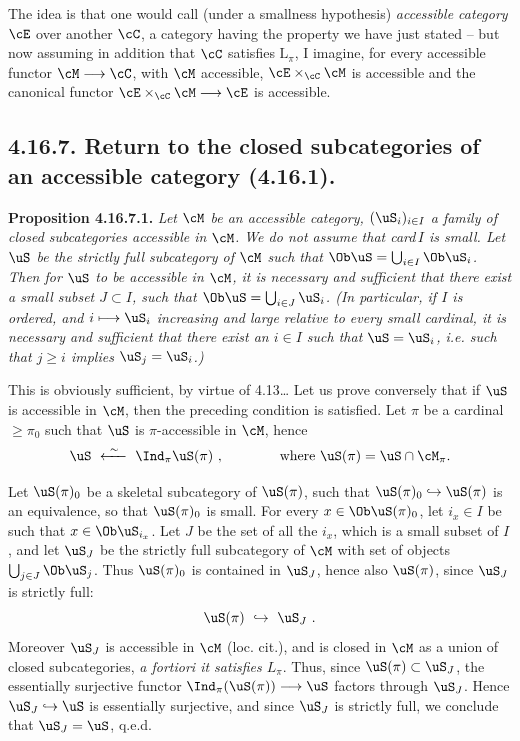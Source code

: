 The idea is that one would call (under a smallness hypothesis) \textit{accessible category $\cE$} over another $\cC$, a category having the property we have just stated -- but now assuming in addition that $\cC$ satisfies $\mathrm{L}_\pi$, I imagine, for every accessible functor $\cM \longrightarrow \cC$, with $\cM$ accessible, $\cE \times_{\cC} \cM$ is accessible and the canonical functor $\cE \times_{\cC} \cM \longrightarrow \cE$ is accessible.

\subsection*{4.16.7. Return to the closed subcategories of an accessible category (4.16.1).}

\textbf{Proposition 4.16.7.1.} \textit{Let $\cM$ be an accessible category, $(\uS_i)_{i\in I}$ a family of closed subcategories accessible in $\cM$. We do not assume that \textup{card}\,$I$ is small. Let $\uS$ be the strictly full subcategory of $\cM$ such that $\Ob \uS = \bigcup_{i\in I} \Ob \uS_i$. Then for $\uS$ %
to be accessible in $\cM$, it is necessary and sufficient that there exist a \textup{small} subset $J \subset I$, such that $\Ob \uS = \bigcup_{i\in J} \uS_i$. (In particular, if $I$ is ordered, and $i \longmapsto \uS_i$ increasing and large relative to every small cardinal, it is necessary and sufficient that there exist an $i \in I$ such that $\uS = \uS_i$, i.e. such that $j \geqslant i$ implies $\uS_j = \uS_i$.)}

This is obviously sufficient, by virtue of 4.13\dots{} Let us prove conversely that if $\uS$ is accessible in $\cM$, then the preceding condition is satisfied. Let $\pi$ be a cardinal $\geqslant \pi_0$ such that $\uS$ is $\pi$-accessible in $\cM$, hence
\[
\uS \ \xleftarrow{\ \sim\ }\ \Ind_\pi \uS(\pi) \ , \qquad\qquad \text{where } \uS(\pi) = \uS \cap \cM_\pi.
\]

Let $\uS(\pi)_0$ be a skeletal subcategory of $\uS(\pi)$, such that $\uS(\pi)_0 \hookrightarrow \uS(\pi)$ is an equivalence, so that $\uS(\pi)_0$ is small. For every $x \in \Ob \uS(\pi)_0$, let $i_x \in I$ be such that $x \in \Ob \uS_{i_x}$. Let $J$ be the set of all the $i_x$, which is a small subset of $I$, and let $\uS_J$ be the strictly full subcategory of $\cM$ with set of objects $\bigcup_{j\in J} \Ob \uS_j$. Thus $\uS(\pi)_0$ is contained in $\uS_J$, hence also $\uS(\pi)$, since $\uS_J$ is strictly full: %
\[
\uS(\pi) \ \hookrightarrow\ \uS_J \ .
\]
Moreover $\uS_J$ is accessible in $\cM$ (loc. cit.), and is closed in $\cM$ as a union of closed subcategories, \textit{a fortiori it satisfies $L_\pi$}. Thus, since $\uS(\pi) \subset \uS_J$, the essentially surjective functor $\Ind_\pi(\uS(\pi)) \longrightarrow \uS$ factors through $\uS_J$. Hence $\uS_J \hookrightarrow \uS$ is essentially surjective, and since $\uS_J$ is strictly full, we conclude that $\uS_J = \uS$, q.e.d.

